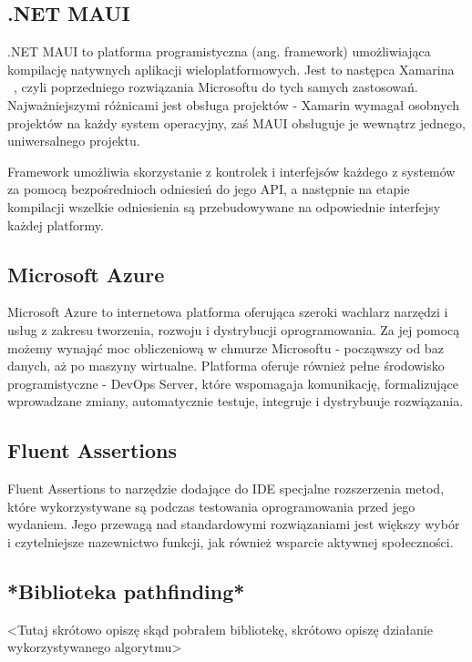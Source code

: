 \subsection{.NET MAUI}
.NET MAUI \cite{mauiDefinition} to platforma programistyczna (ang. framework) umożliwiająca
kompilację natywnych aplikacji wieloplatformowych. Jest to następca Xamarina ~\cite{xamarin},
czyli poprzedniego rozwiązania Microsoftu do tych samych zastosowań. Najważniejszymi różnicami
jest obsługa projektów - Xamarin wymagał osobnych projektów na każdy system operacyjny, zaś MAUI
obsługuje je wewnątrz jednego, uniwersalnego projektu.

Framework umożliwia skorzystanie z kontrolek i interfejsów każdego z systemów za pomocą 
bezpośrednioch odniesień do jego API, a następnie na etapie kompilacji wszelkie odniesienia są
przebudowywane na odpowiednie interfejsy każdej platformy.




\subsection{Microsoft Azure}
Microsoft Azure \cite{azure} to internetowa platforma oferująca szeroki wachlarz narzędzi i usług
z zakresu tworzenia, rozwoju i dystrybucji oprogramowania. Za jej pomocą możemy wynająć moc obliczeniową
w chmurze Microsoftu - począwszy od baz danych, aż po maszyny wirtualne. Platforma oferuje również
pełne środowisko programistyczne - DevOps Server, które wspomagaja komunikację, 
formalizujące wprowadzane zmiany, automatycznie testuje, integruje i dystrybuuje rozwiązania.

\subsection{Fluent Assertions}
Fluent Assertions \cite{fluentassertions} to narzędzie dodające do IDE specjalne rozszerzenia
metod, które wykorzystywane są podczas testowania oprogramowania przed jego wydaniem.
Jego przewagą nad standardowymi rozwiązaniami jest większy wybór i czytelniejsze
nazewnictwo funkcji, jak również wsparcie aktywnej społeczności.


\subsection{*Biblioteka pathfinding*}
<Tutaj skrótowo opiszę skąd pobrałem bibliotekę, skrótowo opiszę działanie wykorzystywanego algorytmu>


